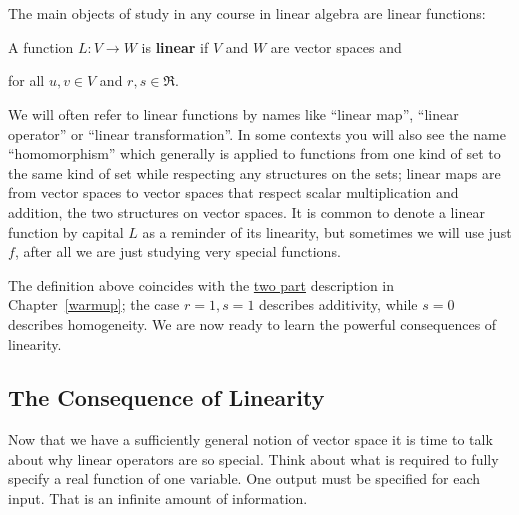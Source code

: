 
\chapter{\linTransTitle}
\label{sec:linearTransformation}

The main objects of study in any course in linear algebra are linear functions:

\begin{definition}
A function $L \colon V\rightarrow W$ is {\bf linear} if $V$ and $W$ are vector spaces and 
\begin{center}
\end{center}
 for all $u,v \in V$ and $r,s \in \Re$.
\end{definition}



\begin{remark}
We will often refer to linear functions by names like ``linear map'', ``linear operator'' or ``linear transformation''. In some contexts
you will also see the name ``homomorphism'' which generally is applied to functions from one kind of set to the same kind of set while respecting any  structures on the sets; linear maps are from vector spaces to vector spaces that respect scalar multiplication and addition, the two structures on vector spaces. It is common to denote a linear function by capital $L$ as a reminder of its linearity, but sometimes we will use just $f$, after all we are just studying very special functions.
\end{remark}

The definition above coincides with the \hyperlink{twopart}{two part} description in Chapter~\ref{warmup};
the case $r=1,s=1$ describes additivity, while  $s=0$ describes homogeneity. 
We are now ready to learn the powerful consequences of linearity.

\section{The Consequence of Linearity}

Now that we have a sufficiently general notion of vector space 
it is time to talk about why linear operators are so special. 
Think about what is required to fully specify a real function of one variable. 
One output must be specified for each input. 
That is an infinite amount of information. 

